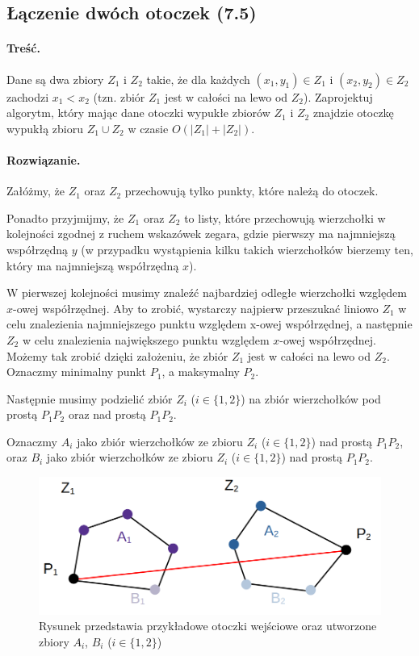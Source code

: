 \subsection{Łączenie dwóch otoczek (7.5)}
\paragraph{Treść.} Dane są dwa zbiory $Z_1$ i $Z_2$ takie, że dla każdych $(x_1, y_1) \in Z_1$ i $(x_2, y_2) \in Z_2$ zachodzi $x_1 < x_2$ (tzn. zbiór $Z_1$ jest w całości na lewo od $Z_2$). Zaprojektuj algorytm, który mając dane otoczki wypukłe zbiorów $Z_1$ i $Z_2$
znajdzie otoczkę wypukłą zbioru $Z_1 \cup Z_2$ w czasie $O(|Z_1| + |Z_2|)$.

\paragraph{Rozwiązanie.} 
Załóżmy, że $Z_1$ oraz $Z_2$ przechowują tylko punkty, które należą do 
otoczek.

Ponadto przyjmijmy, że $Z_1$ oraz $Z_2$ to listy, które przechowują wierzchołki w kolejności zgodnej z ruchem wskazówek zegara, gdzie pierwszy ma najmniejszą współrzędną $y$ (w przypadku wystąpienia kilku takich wierzchołków bierzemy ten, który ma najmniejszą współrzędną $x$).

W pierwszej kolejności musimy znaleźć najbardziej odległe 
wierzchołki względem $x$-owej współrzędnej. Aby to zrobić, wystarczy
najpierw przeszukać liniowo $Z_1$ w celu znalezienia
najmniejszego punktu względem x-owej współrzędnej, a następnie $Z_2$ w celu znalezienia największego punktu względem $x$-owej współrzędnej. Możemy 
tak zrobić dzięki założeniu, że zbiór $Z_1$ jest w całości na lewo od $Z_2$. Oznaczmy minimalny punkt $P_1$, a maksymalny $P_2$.

Następnie musimy podzielić zbiór $Z_i$ ($i \in \{1, 2\}$) na 
zbiór wierzchołków pod prostą $P_1P_2$ oraz nad prostą $P_1P_2$.

Oznaczmy $A_i$ jako zbiór wierzchołków ze zbioru $Z_i$ ($i \in \{1, 2\}$) nad prostą $P_1P_2$, oraz $B_i$ jako zbiór wierzchołków ze zbioru $Z_i$ ($i \in \{1, 2\}$) nad prostą $P_1P_2$.

\begin{figure}[H]
	\centering
	\includegraphics[scale=0.5]{data/zad75.png}
	\caption{Rysunek przedstawia przykładowe otoczki wejściowe oraz utworzone zbiory $A_i$, $B_i$ ($i \in \{1, 2\}$)}
	\label{fig:laczenieotoczek}
\end{figure}

